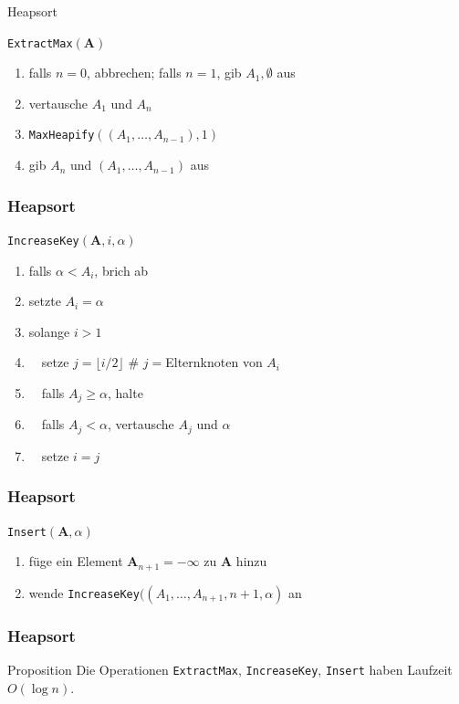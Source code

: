 \documentclass[aspectratio=1610, 11pt]{beamer}
\renewcommand{\vec}[1]{\boldsymbol{#1}}
\newcommand\vA{\vec A}
\begin{document}
\begin{frame}{Heapsort}
	\begin{exampleblock}{\tt ExtractMax$(\vA)$}
		\begin{enumerate}
			\item falls $n=0$, abbrechen; falls $n=1$, gib $A_1,\emptyset$ aus
			\item vertausche $A_1$ und $A_n$
			\item {\tt MaxHeapify}$((A_1,\ldots,A_{n-1}),1)$
			\item gib $A_n$ und $(A_1,\ldots,A_{n-1})$ aus
		\end{enumerate}
	\end{exampleblock}
\end{frame}

\begin{frame}\frametitle{Heapsort}
	\begin{exampleblock}{\tt IncreaseKey$(\vA,i,\alpha)$}
		\begin{enumerate}
			\item falls $\alpha<A_i$, brich ab
			\item setzte $A_i=\alpha$
			\item solange $i>1$
			\item $\quad$setze $j=\lfloor i/2\rfloor$ \hfill\# $j=$Elternknoten von $A_i$
			\item $\quad$falls $A_j\geq\alpha$, halte
			\item $\quad$falls $A_j<\alpha$, vertausche $A_j$ und $\alpha$
			\item $\quad$setze $i=j$
		\end{enumerate}
	\end{exampleblock}
\end{frame}

\begin{frame}\frametitle{Heapsort}
	\begin{exampleblock}{\tt Insert$(\vA,\alpha)$}
		\begin{enumerate}
			\item f\"uge ein Element $\vA_{n+1}=-\infty$ zu $\vA$ hinzu
			\item wende {\tt IncreaseKey}$((A_1,\ldots,A_{n+1},n+1,\alpha)$ an
		\end{enumerate}
	\end{exampleblock}
\end{frame}

\begin{frame}\frametitle{Heapsort}
	\begin{block}{Proposition}
		Die Operationen {\tt ExtractMax}, {\tt IncreaseKey}, {\tt Insert} haben Laufzeit $O(\log n)$.
	\end{block}
\end{frame}
\end{document}
